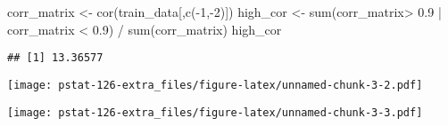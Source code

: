 \documentclass[
]{article}
\newenvironment{Shaded}{\begin{snugshade}}{\end{snugshade}}
\newcommand{\AttributeTok}[1]{\textcolor[rgb]{0.77,0.63,0.00}{#1}}
\newcommand{\DecValTok}[1]{\textcolor[rgb]{0.00,0.00,0.81}{#1}}
\newcommand{\FloatTok}[1]{\textcolor[rgb]{0.00,0.00,0.81}{#1}}
\newcommand{\FunctionTok}[1]{\textcolor[rgb]{0.00,0.00,0.00}{#1}}
\newcommand{\NormalTok}[1]{#1}
\newcommand{\OtherTok}[1]{\textcolor[rgb]{0.56,0.35,0.01}{#1}}
\newcommand{\SpecialCharTok}[1]{\textcolor[rgb]{0.00,0.00,0.00}{#1}}
\newcommand{\StringTok}[1]{\textcolor[rgb]{0.31,0.60,0.02}{#1}}
\begin{document}
\begin{Shaded}
\begin{Highlighting}[]
\NormalTok{corr\_matrix }\OtherTok{\textless{}{-}} \FunctionTok{cor}\NormalTok{(train\_data[,}\FunctionTok{c}\NormalTok{(}\SpecialCharTok{{-}}\DecValTok{1}\NormalTok{,}\SpecialCharTok{{-}}\DecValTok{2}\NormalTok{)])}
\NormalTok{high\_cor }\OtherTok{\textless{}{-}} \FunctionTok{sum}\NormalTok{(corr\_matrix}\SpecialCharTok{\textgreater{}} \FloatTok{0.9} \SpecialCharTok{|}\NormalTok{ corr\_matrix }\SpecialCharTok{\textless{}} \FloatTok{0.9}\NormalTok{) }\SpecialCharTok{/} \FunctionTok{sum}\NormalTok{(corr\_matrix)}
\NormalTok{high\_cor}
\end{Highlighting}
\end{Shaded}

\begin{verbatim}
## [1] 13.36577
\end{verbatim}

\begin{Shaded}
\end{Shaded}

\texttt{[image: pstat-126-extra\_files/figure-latex/unnamed-chunk-3-2.pdf]}

\begin{Shaded}
\end{Shaded}

\texttt{[image: pstat-126-extra\_files/figure-latex/unnamed-chunk-3-3.pdf]}

\begin{Shaded}
\end{Shaded}
\end{document}
